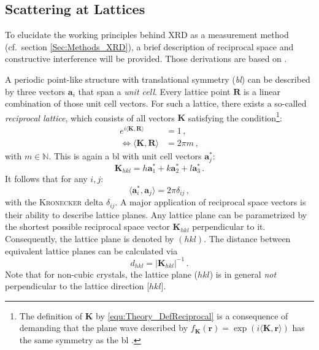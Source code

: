 \subsection{Scattering at Lattices}
To elucidate the working principles behind \gls{XRD} as a measurement method (cf.\ section \ref{Sec:Methods_XRD}), a brief description of reciprocal space and constructive interference will be provided.
Those derivations are based on \textcite{ashcroft1976}.

A periodic point-like structure with translational symmetry (\emph{\gls{bl}}) can be described by three vectors $\mathbf{a}_i$ that span a \emph{unit cell}.
Every lattice point $\mathbf{R}$ is a linear combination of those unit cell vectors.
For such a lattice, there exists a so-called \emph{reciprocal lattice}, which consists of all vectors $\mathbf{K}$ satisfying the condition\footnote{
    The definition of $\textbf{K}$ by \eqref{equ:Theory_DefReciprocal} is a consequence of demanding that the plane wave described by $f_\mathbf{K}(\mathbf{r})=\exp(i\langle\mathbf{K},\mathbf{r}\rangle)$ has the same symmetry as the \gls{bl}
        \cite{ashcroft1976}.
}:
\begin{align}
    e^{i\langle\mathbf{K},\mathbf{R}\rangle}&=1\,,
    \label{equ:Theory_DefReciprocal}\\
    \Leftrightarrow\langle\mathbf{K},\mathbf{R}\rangle&=2\pi m\,,
    \label{Equ:Theory_DefReciprocal2}
\end{align}
with $m\in\mathbb{N}$.
This is again a \gls{bl} with unit cell vectors $\mathbf{a}_j^*$:
\begin{equation}
    \mathbf{K}_{hkl}=h\mathbf{a}_1^*+k\mathbf{a}_2^*+l\mathbf{a}_3^*\,.
\end{equation}
It follows that for any $i,j$:
\begin{equation}
    \langle\mathbf{a}_i^*,\mathbf{a}_j\rangle=2\pi\delta_{ij}\,,
\end{equation}
with the \textsc{Kronecker} delta $\delta_{ij}$.
A major application of reciprocal space vectors is their ability to describe lattice planes.
Any lattice plane can be parametrized by the shortest possible reciprocal space vector $\mathbf{K}_{hkl}$ perpendicular to it.
Consequently, the lattice plane is denoted by $(hkl)$.
The distance between equivalent lattice planes can be calculated via
\begin{equation}\label{Equ:Theory_planeDistance}
    d_{hkl}=|\mathbf{K}_{hkl}|^{-1}\,.
\end{equation}
Note that for non-cubic crystals, the lattice plane ($hkl$) is in general \textit{not} perpendicular to the lattice direction [$hkl$].

